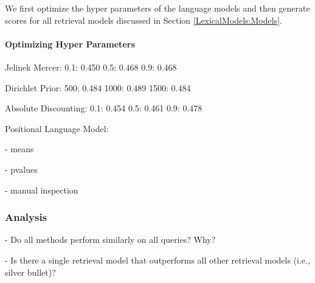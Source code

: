 We first optimize the hyper parameters of the 
language models and then generate scores for
all retrieval models discussed in 
Section \ref{LexicalModels:Models}.

\paragraph{Optimizing Hyper Parameters}


Jelinek Mercer:
0.1: 0.450
0.5: 0.468
0.9: 0.468

Dirichlet Prior:
500: 0.484
1000: 0.489
1500: 0.484

Absolute Discounting:
0.1: 0.454
0.5: 0.461
0.9: 0.478




Positional Language Model:




- means



- pvalues

- manual inspection

\subsubsection{Analysis}
\label{AnalysisLexicalModels}

- Do all methods perform similarly on all queries? Why?

- Is there a single retrieval model that outperforms all other retrieval models (i.e., silver bullet)?